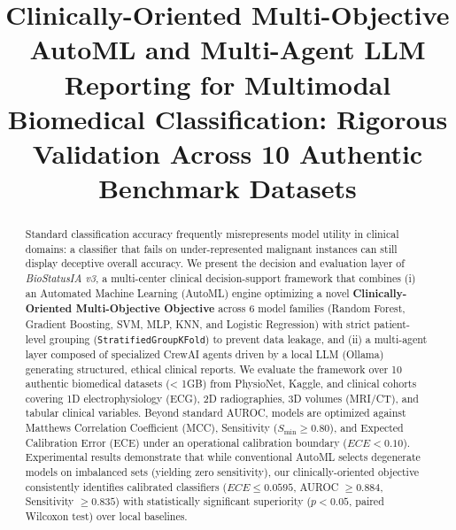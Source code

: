 \documentclass[conference]{IEEEtran}
\begin{document}
\title{Clinically-Oriented Multi-Objective AutoML and Multi-Agent LLM Reporting for Multimodal Biomedical Classification: Rigorous Validation Across 10 Authentic Benchmark Datasets}

\author{
}

\maketitle

\begin{abstract}
Standard classification accuracy frequently misrepresents model utility in clinical domains: a classifier that fails on under-represented malignant instances can still display deceptive overall accuracy. We present the decision and evaluation layer of \emph{BioStatusIA v3}, a multi-center clinical decision-support framework that combines (i) an Automated Machine Learning (AutoML) engine optimizing a novel \textbf{Clinically-Oriented Multi-Objective Objective} across 6 model families (Random Forest, Gradient Boosting, SVM, MLP, KNN, and Logistic Regression) with strict patient-level grouping (\texttt{StratifiedGroupKFold}) to prevent data leakage, and (ii) a multi-agent layer composed of specialized CrewAI agents driven by a local LLM (Ollama) generating structured, ethical clinical reports. We evaluate the framework over 10 authentic biomedical datasets (< 1GB) from PhysioNet, Kaggle, and clinical cohorts covering 1D electrophysiology (ECG), 2D radiographies, 3D volumes (MRI/CT), and tabular clinical variables. Beyond standard AUROC, models are optimized against Matthews Correlation Coefficient (MCC), Sensitivity ($S_{\min} \ge 0.80$), and Expected Calibration Error (ECE) under an operational calibration boundary ($ECE < 0.10$). Experimental results demonstrate that while conventional AutoML selects degenerate models on imbalanced sets (yielding zero sensitivity), our clinically-oriented objective consistently identifies calibrated classifiers ($ECE \le 0.0595$, AUROC $\ge 0.884$, Sensitivity $\ge 0.835$) with statistically significant superiority ($p < 0.05$, paired Wilcoxon test) over local baselines.
\end{abstract}
\end{document}
